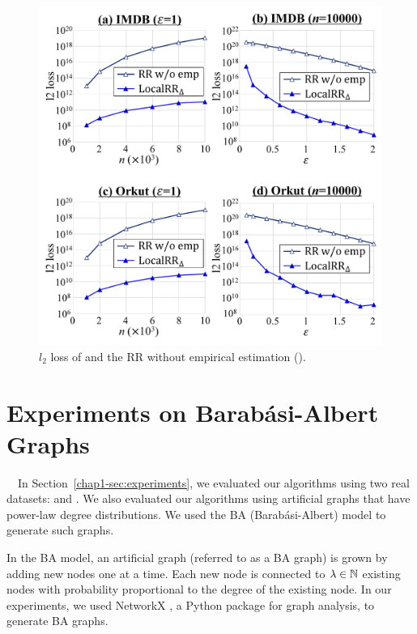 \begin{figure}[t]
\centering
\includegraphics[width=0.99\linewidth]{fig/res5_RR_wo_emp.pdf}

\caption{$l_2$ loss of  and the RR without empirical estimation ().}
\label{chap1-fig:res5_RR_wo_emp}
\end{figure}

\section{Experiments on Barab\'{a}si-Albert Graphs}
\label{chap1-sec:BAGraph}
{}~~In Section~\ref{chap1-sec:experiments}, we evaluated our algorithms using two real datasets: \IMDB{} and \Orkut{}. 
We also evaluated our algorithms using artificial graphs that have power-law degree distributions. 
We used the BA (Barab\'{a}si-Albert) model \cite{NetworkScience} to generate such graphs.

In the BA model, an artificial graph (referred to as a BA graph)
is grown by adding new nodes one at a time. 
Each new node is connected to $\lambda \in \mathbb{N}$ existing nodes with probability proportional to the degree of the existing node. 
In our experiments, we used 
NetworkX \cite{Hagberg_SciPy08}, a Python package for graph analysis, to generate BA graphs.

